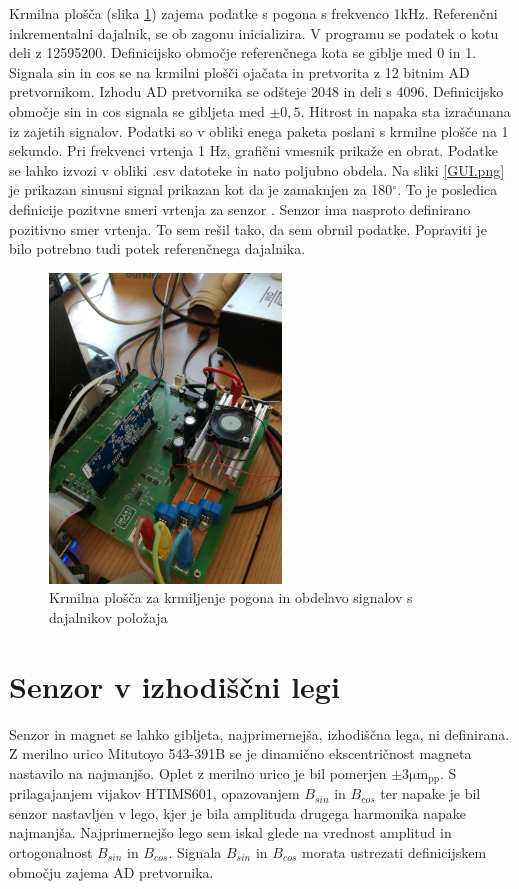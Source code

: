Krmilna plošča (slika \ref{krmilnaplosca.jpg}) zajema podatke s pogona s frekvenco 1kHz.
Referenčni inkrementalni dajalnik, se ob zagonu inicializira. V programu se podatek o kotu deli z 12595200. Definicijsko območje referenčnega kota se giblje med 0 in 1.
Signala sin in cos se na krmilni plošči ojačata in pretvorita z 12 bitnim AD pretvornikom. Izhodu AD pretvornika se odšteje 2048 in deli s 4096. Definicijsko območje sin in cos signala se gibljeta med $\pm0,5$.
Hitrost in napaka sta izračunana iz zajetih signalov.
Podatki so v obliki enega paketa poslani s krmilne plošče na 1 sekundo. Pri frekvenci vrtenja 1 Hz, grafični vmesnik prikaže en obrat.
Podatke se lahko izvozi v obliki .csv datoteke in nato poljubno obdela.
Na sliki  \ref{GUI.png} je prikazan sinusni signal prikazan kot da je zamaknjen za 180$\mathrm{^\circ}$. To je posledica definicije pozitvne smeri vrtenja za senzor \cite{RM44}. Senzor ima nasproto definirano pozitivno smer vrtenja. To sem rešil tako, da sem obrnil podatke. Popraviti je bilo potrebno tudi potek referenčnega dajalnika.
\begin{figure}[!ht]
	\centering
	\includegraphics[width=0.55\textwidth]{./Slike/krmilnaplosca.jpg}
	\caption{Krmilna plošča za krmiljenje pogona in obdelavo signalov s dajalnikov položaja}
	\label{krmilnaplosca.jpg}
\end{figure}
\newpage
\section{Senzor v izhodiščni legi}
Senzor in magnet se lahko gibljeta, najprimernejša, izhodiščna lega, ni definirana. Z merilno urico Mitutoyo 543-391B se je dinamično ekscentričnost magneta nastavilo na najmanjšo. Oplet z merilno urico je bil pomerjen $\pm 3 \mathrm{\mu m_{pp}}$.
S prilagajanjem vijakov HTIMS601, opazovanjem $B_{sin}$ in $B_{cos}$ ter napake je bil senzor nastavljen v lego, kjer je bila amplituda drugega harmonika napake najmanjša. Najprimernejšo lego sem iskal glede na vrednost amplitud in ortogonalnost  $B_{sin}$ in $B_{cos}$. Signala $B_{sin}$ in $B_{cos}$ morata ustrezati definicijskem območju zajema AD pretvornika.

